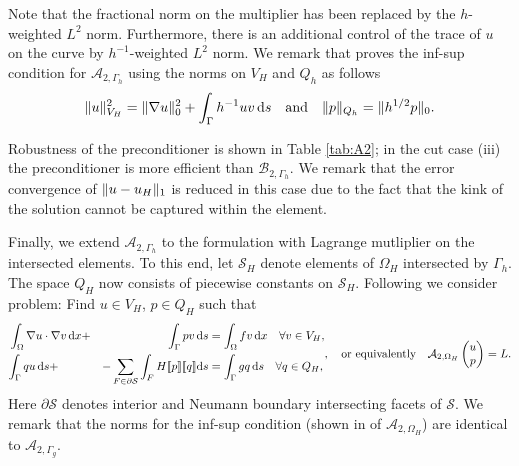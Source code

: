 Note that the fractional norm on the multiplier has been replaced by the $h$-weighted
$L^2$ norm. Furthermore, there is an additional control of the trace of $u$ on
the curve by $h^{-1}$-weighted $L^2$ norm. We remark that \cite{burman2014projection} proves
the inf-sup condition for $\mathcal{A}_{2, \Gamma_h}$ using the norms on $V_H$ and
$Q_h$ as follows
\[
\lVert{u}\rVert^2_{V_H} = \lVert{\nabla u}\rVert^2_0 + \int_{\Gamma}h^{-1} u v\,\mathrm{d}s
\quad\mbox{and}\quad
\lVert{p}\rVert_{Q_h} = \lVert{h^{1/2} p}\rVert_0.
\]

Robustness of the preconditioner is
shown in Table \ref{tab:A2}; in the cut case (iii) the preconditioner is more
efficient than $\mathcal{B}_{2, \Gamma_h}$. We remark that the error convergence
of $\lVert{u-u_H}\rVert_1$ is reduced in this case due to the fact that the kink
of the solution cannot be captured within the element.

Finally, we extend $\mathcal{A}_{2, \Gamma_h}$ to the formulation with Lagrange
mutliplier on the intersected elements. To this end, let $\mathcal{S}_H$ denote
elements of $\Omega_H$ intersected by $\Gamma_h$. The space $Q_H$ now consists
of piecewise constants on $\mathcal{S}_H$. Following \cite[\S 4.B]{burman2014projection}
we consider problem: Find $u\in V_H$, $p\in  Q_H$ such that
%
\[
\begin{aligned}
  &\int_{\Omega}\nabla u\cdot\nabla v\,\mathrm{d}x + &{\int_{\Gamma}p v\,\mathrm{d}s} &= \int_{\Omega}f v\,\mathrm{d}x\quad\forall v\in V_H,\\
  &{\int_{\Gamma}q u\,\mathrm{d}s} + &-\sum_{F\in\partial\mathcal{S}}\int_{F}H[\![p]\!][\![q]\!] \mathrm{d}s &= \int_{\Gamma}g q\,\mathrm{d}s\quad\forall q\in Q_H,\\
\end{aligned},
\quad\mbox{or equivalently}\quad
\mathcal{A}_{2, \Omega_H}\begin{pmatrix}u\\p\\\end{pmatrix} = L.
\]
%
Here $\partial\mathcal{S}$ denotes interior and Neumann boundary intersecting
facets of $\mathcal{S}$. We remark that the norms for the inf-sup condition (shown
in \cite{burman2014projection} of $\mathcal{A}_{2, \Omega_H}$) are identical to $\mathcal{A}_{2, \Gamma_g}$.

